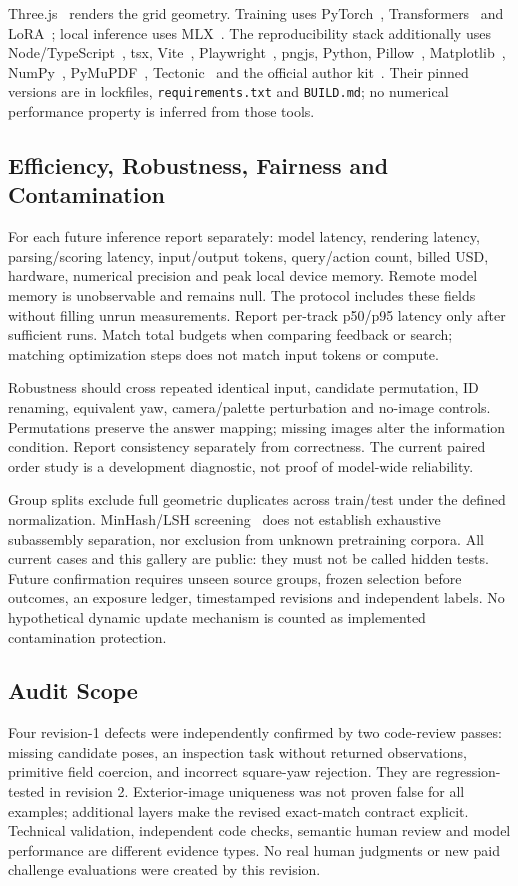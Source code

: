 Three.js~\cite{threejs} renders the grid geometry. Training uses
PyTorch~\cite{paszke2019pytorch}, Transformers~\cite{wolf2020transformers} and
LoRA~\cite{hu2022lora}; local inference uses MLX~\cite{mlx}.
The reproducibility stack additionally uses Node/TypeScript~\cite{nodets}, tsx,
Vite~\cite{vite}, Playwright~\cite{playwright}, pngjs, Python,
Pillow~\cite{pillow}, Matplotlib~\cite{hunter2007matplotlib},
NumPy~\cite{harris2020numpy}, PyMuPDF~\cite{pymupdf}, Tectonic~\cite{tectonic}
and the official author kit~\cite{cvprkit}.
Their pinned versions are in lockfiles, \texttt{requirements.txt} and
\texttt{BUILD.md}; no numerical performance property is inferred from those tools.

\subsection{Efficiency, Robustness, Fairness and Contamination}
For each future inference report separately: model latency, rendering latency,
parsing/scoring latency, input/output tokens, query/action count, billed USD,
hardware, numerical precision and peak local device memory. Remote model memory is
unobservable and remains null. The protocol includes these fields without filling
unrun measurements. Report per-track p50/p95 latency only after sufficient runs.
Match total budgets when comparing feedback or search; matching optimization steps
does not match input tokens or compute.

Robustness should cross repeated identical input, candidate permutation, ID
renaming, equivalent yaw, camera/palette perturbation and no-image controls.
Permutations preserve the answer mapping; missing images alter the information
condition. Report consistency separately from correctness. The current paired order
study is a development diagnostic, not proof of model-wide reliability.

Group splits exclude full geometric duplicates across train/test under the defined
normalization. MinHash/LSH screening~\cite{broder1997} does not establish exhaustive
subassembly separation, nor exclusion from unknown pretraining corpora. All current
cases and this gallery are public: they must not be called hidden tests.
Future confirmation requires unseen source groups, frozen selection before outcomes,
an exposure ledger, timestamped revisions and independent labels. No hypothetical
dynamic update mechanism is counted as implemented contamination protection.

\subsection{Audit Scope}
Four revision-1 defects were independently confirmed by two code-review passes:
missing candidate poses, an inspection task without returned observations, primitive
field coercion, and incorrect square-yaw rejection. They are regression-tested in
revision 2. Exterior-image uniqueness was not proven false for all examples;
additional layers make the revised exact-match contract explicit.
Technical validation, independent code checks, semantic human review and model
performance are different evidence types. No real human judgments or new paid
challenge evaluations were created by this revision.

